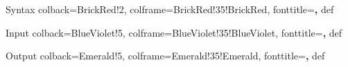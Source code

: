 
\lstset{aboveskip=\baselineskip,belowskip=\baselineskip,basicstyle=\ttfamily} %

\makeatletter 
\renewcommand{\thesection}{%
  \ifnum\c@chapter<1 \@arabic\c@section
  \else \thechapter.\@arabic\c@section
  \fi
}
\makeatother

\makeatletter
\newcommand*{\Xbar}{}%
\DeclareRobustCommand*{\Xbar}{%
  \mathpalette\@Xbar{}%
}

  {Syntax}%
  {%
    colback=BrickRed!2,
    colframe=BrickRed!35!BrickRed,
    fonttitle=\bfseries,
  }%
  {def}%

  {Input}%
  {%
    colback=BlueViolet!5,
    colframe=BlueViolet!35!BlueViolet,
    fonttitle=\bfseries,
  }%
  {def}%

  {Output}%
  {%
    colback=Emerald!5,
    colframe=Emerald!35!Emerald,
    fonttitle=\bfseries,
  }%
  {def}%


\newcommand*{\@Xbar}[2]{%
  \sbox0{$#1\mathrm{X}\m@th$}%
  \sbox2{$#1X\m@th$}%
  \rlap{%
    \hbox to\wd2{%
      \hfill
      $\overline{%
        \vrule width 0pt height\ht0 %
        \kern\wd0 %
      }$
    }
  }
  \copy2
}
\makeatother

